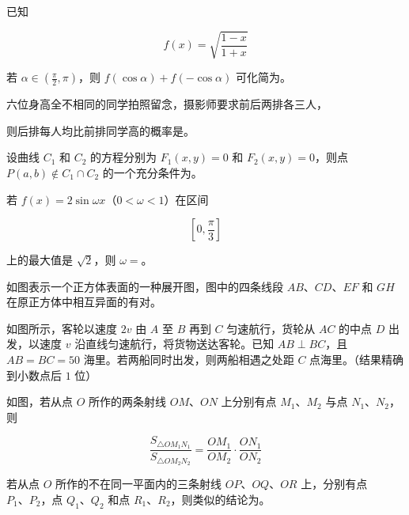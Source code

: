 \begin{question}
已知

\nopagebreak[4]
\[
f(x)=\sqrt{\frac{1-x}{1+x}}
\]

若 $\alpha\in\left(\frac\pi2,\pi\right)$，则 $f(\cos\alpha)+f(-\cos\alpha)$ 可化简为\gkblank{}。

\end{question}
\begin{question}
六位身高全不相同的同学拍照留念，摄影师要求前后两排各三人，

则后排每人均比前排同学高的概率是\gkblank{}。

\end{question}
\begin{question}
设曲线 $C_1$ 和 $C_2$ 的方程分别为 $F_1(x,y)=0$ 和 $F_2(x,y)=0$，则点 $P(a,b)\notin C_1\cap C_2$ 的一个充分条件为\gkblank{}。

\end{question}
\begin{question}
若 $f(x)=2\sin\omega x$（$0<\omega<1$）在区间

\nopagebreak[4]
\[
\left[0,\frac\pi3\right]
\]

上的最大值是 $\sqrt2$，则 $\omega=$\gkblank{}。

\Needspace{0.4\textheight}
\end{question}
\begin{question}
如图表示一个正方体表面的一种展开图，图中的四条线段 $AB\text{、}CD\text{、}EF$ 和 $GH$ 在原正方体中相互异面的有\gkblank{}对。
\nopagebreak[4]
\begin{center}\end{center}
\nopagebreak[4]
\Needspace{0.4\textheight}
\end{question}
\begin{question}
如图所示，客轮以速度 $2v$ 由 $A$ 至 $B$ 再到 $C$ 匀速航行，货轮从 $AC$ 的中点 $D$ 出发，以速度 $v$ 沿直线匀速航行，将货物送达客轮。已知 $AB\perp BC$，且 $AB=BC=50$ 海里。若两船同时出发，则两船相遇之处距 $C$ 点\gkblank{}海里。（结果精确到小数点后 $1$ 位）
\nopagebreak[4]
\begin{center}\end{center}
\nopagebreak[4]
\Needspace{0.4\textheight}
\end{question}
\begin{question}
如图，若从点 $O$ 所作的两条射线 $OM\text{、}ON$ 上分别有点 $M_1\text{、}M_2$ 与点 $N_1\text{、}N_2$，则

\nopagebreak[4]
\[
\frac{S_{\triangle OM_1N_1}}{S_{\triangle OM_2N_2}}
=\frac{OM_1}{OM_2}\cdot\frac{ON_1}{ON_2}
\]

若从点 $O$ 所作的不在同一平面内的三条射线 $OP\text{、}OQ\text{、}OR$ 上，分别有点 $P_1\text{、}P_2$，点 $Q_1\text{、}Q_2$ 和点 $R_1\text{、}R_2$，则类似的结论为\gkblank{}。
\nopagebreak[4]
\begin{center}\end{center}
\nopagebreak[4]
\end{question}

